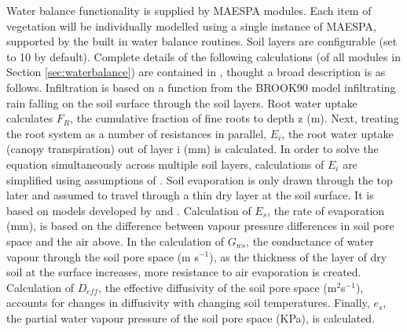 \documentclass[final,3p,times,authoryear]{elsarticle}
\begin{document}






\label{sec:waterbalance}
Water balance functionality is supplied by MAESPA modules. Each item of vegetation will be individually modelled using a single instance of MAESPA, supported by the built in water balance routines. Soil layers are configurable (set to 10 by default). Complete details of the following calculations (of all modules in Section \ref{sec:waterbalance}) are contained in \cite{Duursma2012}, thought a broad description is as follows. Infiltration is based on a function from the BROOK90 model \citep{Federer2003} infiltrating rain falling on the soil surface through the soil layers. Root water uptake calculates $F_{R}$, the cumulative fraction of fine roots to depth z (m). Next, treating the root system as a number of resistances in parallel, $E_{i}$, the root water uptake (canopy transpiration) out of layer i (mm) is calculated. In order to solve the equation simultaneously across multiple soil layers, calculations of $E_{i}$ are simplified using assumptions of \cite{Taylor1975}. Soil evaporation is only drawn through the top later and assumed to travel through a thin dry layer at the soil surface. It is based on models developed by \cite{Choudhury1988} and \cite{Williams2001}. Calculation of $E_{s}$, the rate of evaporation (mm), is based on the difference between vapour pressure differences in soil pore space and the air above. In the calculation of $G_{ws}$, the conductance of water vapour through the soil pore space (m s$^{-1}$), as the thickness of the layer of dry soil at the surface increases, more resistance to air evaporation is created. Calculation of $D_{eff}$, the effective diffusivity of the soil pore space (m$^{2}$s$^{-1}$), accounts for changes in diffusivity with changing soil temperatures. Finally, $e_{s}$, the partial water vapour pressure of the soil pore space (KPa), is calculated. 
\end{document}
